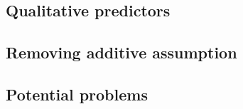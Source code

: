\subsection{Qualitative predictors}


\subsection{Removing additive assumption}


\subsection{Potential problems}
